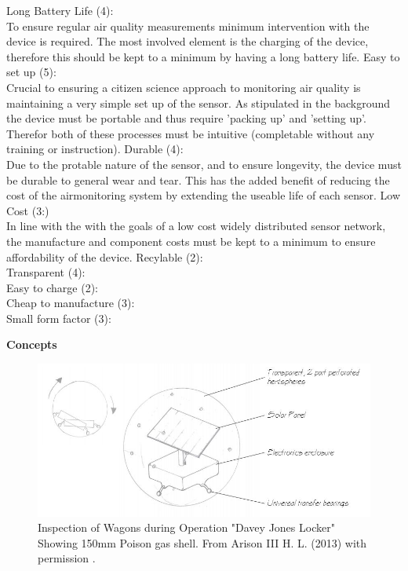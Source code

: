 Long Battery Life (4):\\
To ensure regular air quality measurements minimum intervention with the device is required. The most involved element is the charging of the device, therefore this should be kept to a minimum by having a long battery life.
\vskip 0.1in
Easy to set up (5):\\
Crucial to ensuring a citizen science approach to monitoring air quality is maintaining a very simple set up of the sensor. As stipulated in the background the device must be portable and thus require 'packing up' and 'setting up'. Therefor both of these processes must be intuitive (completable without any training or instruction).
\vskip 0.1in
Durable (4):\\
Due to the protable nature of the sensor, and to ensure longevity, the device must be durable to general wear and tear. This has the added benefit of reducing the cost of the airmonitoring system by extending the useable life of each sensor.
\vskip 0.1in
Low Cost (3:)\\
In line with the with the goals of a low cost widely distributed sensor network, the manufacture and component costs must be kept to a minimum to ensure affordability of the device.
\vskip 0.1in
Recylable (2):\\
\vskip 0.1in
Transparent (4):\\
\vskip 0.1in
Easy to charge (2):\\
\vskip 0.1in
Cheap to manufacture (3):\\
\vskip 0.1in
Small form factor (3):\\
\vskip 0.1in

\textbf{Concepts}\\

\begin{figure}[H]
\centering
\includegraphics[width=0.9\linewidth]{Engineering_hardware/Engineering_hardware_Figures/Concept_ball.JPG}
\caption{Inspection of Wagons during Operation "Davey Jones Locker" Showing 150mm Poison gas shell. From Arison III H. L. (2013) with permission \cite{arison2014european}.  }
\label{fig:15cm_shell_loading}
\end{figure}



